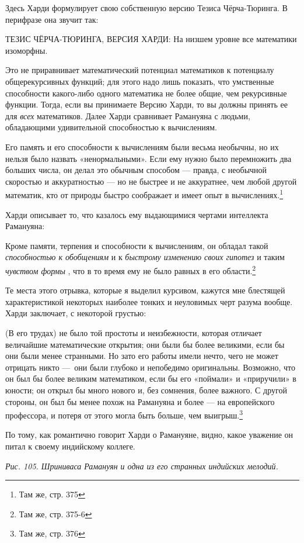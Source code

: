 \documentclass[../main.tex]{subfiles}
\begin{document}
Здесь Харди формулирует свою собственную версию Тезиса Чёрча-Тюринга. В перифразе она звучит так:

ТЕЗИС ЧЁРЧА-ТЮРИНГА, ВЕРСИЯ ХАРДИ: На низшем уровне все математики изоморфны.

Это не приравнивает математический потенциал математиков к потенциалу общерекурсивных функций; для этого надо лишь показать, что умственные способности какого-либо одного математика не более общие, чем рекурсивные функции. Тогда, если вы принимаете Версию Харди, то вы должны принять ее для \emph{всех} математиков. Далее Харди сравнивает Рамануяна с людьми, обладающими удивительной способностью к вычислениям.

Его память и его способности к вычислениям были весьма необычны, но их нельзя было назвать «ненормальными». Если ему нужно было перемножить два больших числа, он делал это обычным способом --- правда, с необычной скоростью и аккуратностью --- но не быстрее и не аккуратнее, чем любой другой математик, кто от природы быстро соображает и имеет опыт в вычислениях.\footnote{Там же, стр. 375}

Харди описывает то, что казалось ему выдающимися чертами интеллекта Рамануяна:

Кроме памяти, терпения и способности к вычислениям, он обладал такой \emph{способностью к обобщениям} и к \emph{быстрому изменению своих гипотез} и таким \emph{чувством формы} , что в то время ему не было равных в его области.\footnote{Там же, стр. 375-6}

Те места этого отрывка, которые я выделил курсивом, кажутся мне блестящей характеристикой некоторых наиболее тонких и неуловимых черт разума вообще. Харди заключает, с некоторой грустью:

(В его трудах) не было той простоты и неизбежности, которая отличает величайшие математические открытия; они были бы более великими, если бы они были менее странными. Но зато его работы имели нечто, чего не может отрицать никто ---~они были глубоко и непобедимо оригинальны. Возможно, что он был бы более великим математиком, если бы его «поймали» и «приручили» в юности; он открыл бы много нового и, без сомнения, более важного. С другой стороны, он был бы менее похож на Рамануяна и более --- на европейского профессора, и потеря от этого могла быть больше, чем выигрыш.\footnote{Там же, стр. 376}

По тому, как романтично говорит Харди о Рамануяне, видно, какое уважение он питал к своему индийскому коллеге.

\emph{Рис. 105. Шриниваса Рамануян и одна из его странных индийских мелодий.}
\end{document}
